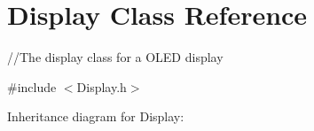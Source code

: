 \hypertarget{classDisplay}{}\section{Display Class Reference}
\label{classDisplay}


//\+The display class for a O\+L\+ED display  




{\ttfamily \#include $<$Display.\+h$>$}



Inheritance diagram for Display\+:
